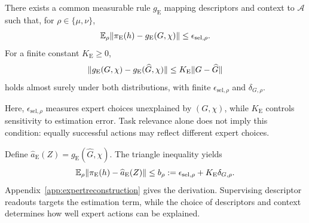 \begin{assumption}
\label{ass:expertselection}
There exists a common measurable rule $g_{\mathrm E}$ mapping descriptors and context to $\mathcal A$ such that, for $\rho\in\{\mu,\nu\}$,
\begin{equation}
 \mathbb E_\rho\lVert\pi_{\mathrm E}(h)-g_{\mathrm E}(G,\chi)\rVert
 \le\epsilon_{\mathrm{sel},\rho}.
 \label{eq:expertselectionapprox}
\end{equation}
For a finite constant $K_{\mathrm E}\ge0$,
\begin{equation}
 \lVert g_{\mathrm E}(G,\chi)-g_{\mathrm E}(\widehat G,\chi)\rVert
 \le K_{\mathrm E}\lVert G-\widehat G\rVert
 \label{eq:expertselectionsensitivity}
\end{equation}
holds almost surely under both distributions, with finite $\epsilon_{\mathrm{sel},\rho}$ and $\delta_{G,\rho}$.
\end{assumption}
Here, $\epsilon_{\mathrm{sel},\rho}$ measures expert choices unexplained by $(G,\chi)$, while $K_{\mathrm E}$ controls sensitivity to estimation error.
Task relevance alone does not imply this condition: equally successful actions may reflect different expert choices.

Define $\widehat a_{\mathrm E}(Z)=g_{\mathrm E}(\widehat G,\chi)$.
The triangle inequality yields
\begin{equation}
 \mathbb E_\rho\lVert\pi_{\mathrm E}(h)-\widehat a_{\mathrm E}(Z)\rVert
 \le b_\rho
 :=\epsilon_{\mathrm{sel},\rho}+K_{\mathrm E}\delta_{G,\rho}.
 \label{eq:expertreconstruction}
\end{equation}
Appendix~\ref{app:expertreconstruction} gives the derivation.
Supervising descriptor readouts targets the estimation term, while the choice of descriptors and context determines how well expert actions can be explained.

